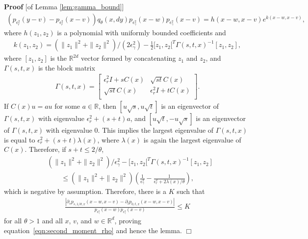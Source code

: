 \documentclass[12pt]{article}
\newenvironment {proof}{{\noindent\bf Proof }}{\hfill $\Box$ \medskip}
\newcommand{\IR}{\mathbb R}
\newcommand{\covq}{C}     %
\begin{document}
\begin{proof}[of Lemma \ref{lem:gamma_bound}]
\begin{align*}
{                ( p_{\epsilon_r^2}(y - v) - p_{\epsilon_r^2}(x - v) )
            q_\theta(x, dy)
        }{
            p_{\epsilon_\gamma^2}(x - w)
            p_{\epsilon_\gamma^2}(x - v)
        }
        =
        h(x-w, x-v) e^{ k(x-w, x-v) },
    \end{align*}
    where $h(z_1, z_2)$ is a polynomial with uniformly bounded coefficients and
    \begin{align*}
        k(z_1, z_2)
        =
        (\|z_1\|^2 + \|z_2\|^2)/(2 \epsilon_\gamma^2)
            - \frac{1}{2} [z_1, z_2[^T \Gamma(s, t, x)^{-1} [z_1, z_2] ,
    \end{align*}
    where $[z_1, z_2]$ is the $\IR^{2d}$ vector formed by concatenating $z_1$ and $z_2$,
    and $\Gamma(s, t, x)$ is the block matrix
    \begin{align*}
        \Gamma(s, t, x)
        =
        \left[
        \begin{array}{cc}
            \epsilon_r^2 I + s \covq(x) & \sqrt{st} \covq(x) \\
            \sqrt{st} \covq(x) & \epsilon_r^2 I + t \covq(x) \\
        \end{array}
        \right] .
    \end{align*}
    If $\covq(x) u = a u$ for some $a \in \IR$,
    then $[u \sqrt{s}, u \sqrt{t}]$ is an eigenvector of $\Gamma(s, t, x)$
    with eigenvalue $\epsilon^2_r + (s+t) a$,
    and $[u \sqrt{t}, - u \sqrt{s}]$ is an eigenvector of $\Gamma(s, t, x)$
    with eigenvalue 0.
    This implies the largest eigenvalue of $\Gamma(s, t, x)$
    is equal to $\epsilon^2_r + (s+t) \lambda(x)$,
    where $\lambda(x)$ is again the largest eigenvalue of $\covq(x)$.
    Therefore, if $s + t \le 2 / \theta$,
    \begin{align*}
        &
        (\|z_1\|^2 + \|z_2\|^2) / \epsilon^2_\gamma
            - [z_1, z_2[^T \Gamma(s, t, x)^{-1} [z_1, z_2]
        \\ &\qquad \le
        (\|z_1\|^2 + \|z_2\|^2) \left(
            \frac{1}{\epsilon^2_\gamma}
            - \frac{1}{\epsilon^2_r +  2\lambda(x)/\theta}
        \right) ,
    \end{align*}
    which is negative by assumption.
    Therefore, there is a $K$ such that
    \begin{align*}
        \frac{ \left|
            \partial_s p_{s, 1/\theta, x}(x-w, x-v)
            - \partial_t p_{0, t, x}(x-w, x-v)
        \right| }{
            p_{\epsilon^2_\gamma}(x - w)
            p_{\epsilon^2_\gamma}(x - v)
        }
        \le K
    \end{align*}
    for all $\theta > 1$ and all $x$, $v$, and $w \in \IR^d$,
    proving equation~\eqref{eqn:second_moment_rho} and hence the lemma.
\end{proof}
\end{document}
